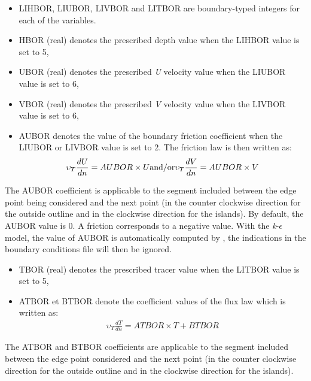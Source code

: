 \begin{itemize}
\item  LIHBOR, LIUBOR, LIVBOR and LITBOR are boundary-typed integers for each
of the variables.

\item HBOR (real) denotes the prescribed depth value when the LIHBOR value
is set to 5,

\item UBOR (real) denotes the prescribed \textit{U} velocity value when
the LIUBOR value is set to 6,

\item VBOR (real) denotes the prescribed \textit{V} velocity value when
the LIVBOR value is set to 6,

\item AUBOR denotes the value of the boundary friction coefficient when
the LIUBOR or LIVBOR value is set to 2. The friction law is then written
as:
\begin{align}
\upsilon_{T} \frac{dU}{dn} = AUBOR \times U {\rm and/or }
\upsilon_{T} \frac{dV}{dn} = AUBOR \times V
\end{align}
\end{itemize}
The AUBOR coefficient is applicable to the segment included between the edge
point being considered and the next point (in the counter clockwise direction
for the outside outline and in the clockwise direction for the islands). By
default, the AUBOR value is 0. A friction corresponds to a negative value. With
the \textit{k}-$\epsilon$ model, the value of AUBOR is automatically computed
by , the indications in the boundary conditions file will then be
ignored.

\begin{itemize}
\item TBOR (real) denotes the prescribed tracer value when the LITBOR
value is set to 5,

\item ATBOR et BTBOR denote the coefficient values of the flux law
which is written as:
\begin{align}
\upsilon _{T} \frac{dT}{dn} = ATBOR \times T + BTBOR
\end{align}
\end{itemize}
The ATBOR and BTBOR coefficients are applicable to the segment included between
the edge point considered and the next point (in the counter clockwise
direction for the outside outline and in the clockwise direction for the
islands).

